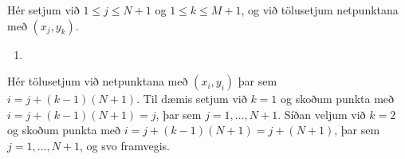 \documentclass[a4paper,10pt,icelandic]{sphinxmanual}
\begin{document}
Hér setjum við \(1\le j \le N+1\) og \(1 \le k \le M+1\), og við tölusetjum netpunktana með \((x_j, y_k)\).
\begin{enumerate}
\def\theenumi{\arabic{enumi}}
\def\labelenumi{\theenumi .}
\makeatletter\def\p@enumii{\p@enumi \theenumi .}\makeatother
\setcounter{enumi}{1}
\item {} 

\end{enumerate}

Hér  tölusetjum við netpunktana með \((x_i, y_i)\) þar sem \(i= j+(k-1)(N+1)\). Til dæmis setjum við  \(k=1\) og skoðum punkta með \(i= j+(k-1)(N+1)=j\), þar sem \(j=1, \dots, N+1\). Síðan veljum við \(k=2\) og skoðum punkta með \(i= j+(k-1)(N+1)=j+(N+1)\), þar sem \(j=1, \dots, N+1\), og svo framvegis.

\end{document}
